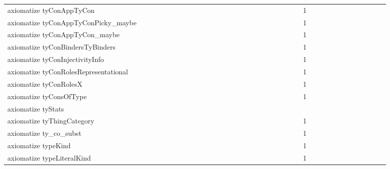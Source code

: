 {\begin{tabular}{l|rrr|rrr|rrr}
axiomatize tyConAppTyCon &  &  &  &  &  &  &  &  &  &  &  &  &  &  &  &  &  &  &  &  &  &  &  & 1 &  &  &  &  &  &  &  &  &  &  &  & \\
axiomatize tyConAppTyConPicky_maybe &  &  &  &  &  &  &  &  &  &  &  &  &  &  &  &  &  &  &  &  &  &  &  & 1 &  &  &  &  &  &  &  &  &  &  &  & \\
axiomatize tyConAppTyCon_maybe &  &  &  &  &  &  &  &  &  &  &  &  &  &  &  &  &  &  &  &  &  &  &  & 1 &  &  &  &  &  &  &  &  &  &  &  & \\
axiomatize tyConBindersTyBinders &  &  &  &  &  &  &  &  &  &  &  &  &  &  &  &  &  &  &  &  &  &  &  & 1 &  &  &  &  &  &  &  &  &  &  &  & \\
axiomatize tyConInjectivityInfo &  &  &  &  &  &  &  &  &  &  &  &  &  &  &  &  &  &  &  &  &  &  &  & 1 &  &  &  &  &  &  &  &  &  &  &  & \\
axiomatize tyConRolesRepresentational &  &  &  &  &  &  &  &  &  &  &  &  &  &  &  &  &  &  &  &  &  &  &  & 1 &  &  &  &  &  &  &  &  &  &  &  & \\
axiomatize tyConRolesX &  &  &  &  &  &  &  &  &  &  &  &  &  &  &  &  &  &  &  &  &  &  &  & 1 &  &  &  &  &  &  &  &  &  &  &  & \\
axiomatize tyConsOfType &  &  &  &  &  &  &  &  &  &  &  &  &  &  &  &  &  &  &  &  &  &  &  & 1 &  &  &  &  &  &  &  &  &  &  &  & \\
axiomatize tyStats &  &  &  &  &  &  &  &  &  &  &  &  &  &  &  &  &  &  &  &  &  &  &  &  &  &  &  &  &  &  &  &  &  &  &  & \\
axiomatize tyThingCategory &  &  &  &  &  &  &  &  &  &  &  &  &  &  &  &  &  &  &  &  &  &  &  & 1 &  &  &  &  &  &  &  &  &  &  &  & \\
axiomatize ty_co_subst &  &  &  &  &  &  &  &  &  &  &  &  &  &  &  &  &  &  &  &  &  &  &  & 1 &  &  &  &  &  &  &  &  &  &  &  & \\
axiomatize typeKind &  &  &  &  &  &  &  &  &  &  &  &  &  &  &  &  &  &  &  &  &  &  &  & 1 &  &  &  &  &  &  &  &  &  &  &  & \\
axiomatize typeLiteralKind &  &  &  &  &  &  &  &  &  &  &  &  &  &  &  &  &  &  &  &  &  &  &  & 1 &  &  &  &  &  &  &  &  &  &  &  & \\

\end{tabular}}

